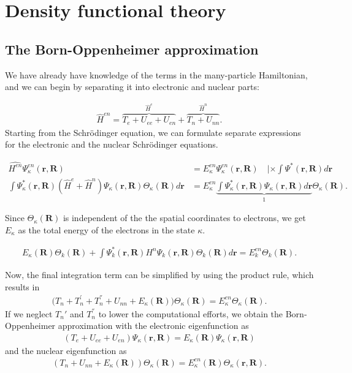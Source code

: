 \chapter{Density functional theory}

\section{The Born-Oppenheimer approximation}
\label{appendix:Born-Oppenheimer}

We have already have knowledge of the terms in the many-particle Hamiltonian, and we can begin by separating it into electronic and nuclear parts:

\begin{align}
  \hat{H}^{en} = \overbrace{T_e + U_{ee} + U_{en}}^{\hat{H}^{e}} + \overbrace{T_n + U_{nn}}^{\hat{H}^{n}}.
\end{align}
Starting from the Schrödinger equation, we can formulate separate expressions for the electronic and the nuclear Schrödinger equations.

\begin{align}
  \hat{H^{en}} \Psi_\kappa^{en}(\textbf{r},\textbf{R}) &= E_\kappa^{en}\Psi_\kappa^{en}(\textbf{r},\textbf{R}) \quad \lvert \times \int \Psi^*(\textbf{r},\textbf{R}) d\textbf{r} \\
  \int \Psi_\kappa^*(\textbf{r},\textbf{R}) (\hat{H}^e + \hat{H}^n)\Psi_\kappa(\textbf{r},\textbf{R})\Theta_\kappa(\textbf{R})d\textbf{r} &= E_\kappa^{en} \underbrace{\int \Psi_\kappa ^* (\textbf{r},\textbf{R}) \Psi_\kappa (\textbf{r},\textbf{R}) d\textbf{r}}_{1} \Theta_\kappa(\textbf{R}).
\end{align}

Since $\Theta_\kappa(\textbf{R})$ is independent of the the spatial coordinates to electrons, we get $E_{\kappa}$ as the total energy of the electrons in the state $\kappa$.

\begin{align}
     E_\kappa(\textbf{R}) \Theta_k(\textbf{R}) + \int \Psi_k^*(\textbf{r},\textbf{R})H^n\Psi_k(\textbf{r},\textbf{R})\Theta_k(\textbf{R})d\textbf{r} = E_k^{en} \Theta_k(\textbf{R}).
\end{align}

Now, the final integration term can be simplified by using the product rule, which results in
\begin{align}
    \Big( T_n+T_n^{'} + T_n^{''} +U_{nn} + E_\kappa(\textbf{R}) \Big)\Theta_\kappa(\textbf{R}) = E_\kappa^{en}\Theta_\kappa (\textbf{R}).
\end{align}
If we neglect $T_n'$ and $T_n^{''}$ to lower the computational efforts, we obtain the Born-Oppenheimer approximation with the electronic eigenfunction as
\begin{align}
    \left( T_e + U_{ee} + U_{en} \right) \Psi_\kappa (\textbf{r},\textbf{R}) = E_{\kappa}(\textbf{R})\Psi_\kappa(\textbf{r},\textbf{R})
\end{align}
and the nuclear eigenfunction as
\begin{align}
    \left(T_n + U_{nn} + E_\kappa (\textbf{R}) \right) \Theta_\kappa(\textbf{R})= E_{\kappa}^{en}(\textbf{R})\Theta_\kappa(\textbf{r},\textbf{R}).
\end{align}

